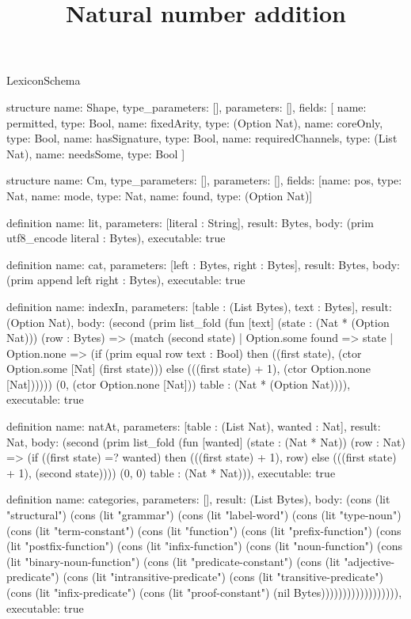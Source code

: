 \begin{lexlean}{LexiconSchema}
\title{Natural number addition}
\begin{semanticmodule}
structure{
  name: Shape,
  type_parameters: [],
  parameters: [],
  fields: [
    {name: permitted, type: Bool},
    {name: fixedArity, type: (Option Nat)},
    {name: coreOnly, type: Bool},
    {name: hasSignature, type: Bool},
    {name: requiredChannels, type: (List Nat)},
    {name: needsSome, type: Bool}
  ]
}

structure{
  name: Cm,
  type_parameters: [],
  parameters: [],
  fields: [{name: pos, type: Nat}, {name: mode, type: Nat}, {name: found, type: (Option Nat)}]
}

definition{
  name: lit,
  parameters: [literal : String],
  result: Bytes,
  body: (prim utf8_encode literal : Bytes),
  executable: true
}

definition{
  name: cat,
  parameters: [left : Bytes, right : Bytes],
  result: Bytes,
  body: (prim append left right : Bytes),
  executable: true
}

definition{
  name: indexIn,
  parameters: [table : (List Bytes), text : Bytes],
  result: (Option Nat),
  body: (second (prim list_fold (fun [text] (state : (Nat * (Option Nat))) (row : Bytes) => (match (second state)
    | Option.some found => state
    | Option.none => (if (prim equal row text : Bool) then ((first state), (ctor Option.some [Nat] (first state))) else (((first state) + 1), (ctor Option.none [Nat]))))) (0, (ctor Option.none [Nat])) table : (Nat * (Option Nat)))),
  executable: true
}

definition{
  name: natAt,
  parameters: [table : (List Nat), wanted : Nat],
  result: Nat,
  body: (second (prim list_fold (fun [wanted] (state : (Nat * Nat)) (row : Nat) => (if ((first state) =? wanted) then (((first state) + 1), row) else (((first state) + 1), (second state)))) (0, 0) table : (Nat * Nat))),
  executable: true
}

definition{
  name: categories,
  parameters: [],
  result: (List Bytes),
  body: (cons (lit "structural") (cons (lit "grammar") (cons (lit "label-word") (cons (lit "type-noun") (cons (lit "term-constant") (cons (lit "function") (cons (lit "prefix-function") (cons (lit "postfix-function") (cons (lit "infix-function") (cons (lit "noun-function") (cons (lit "binary-noun-function") (cons (lit "predicate-constant") (cons (lit "adjective-predicate") (cons (lit "intransitive-predicate") (cons (lit "transitive-predicate") (cons (lit "infix-predicate") (cons (lit "proof-constant") (nil Bytes)))))))))))))))))),
  executable: true
}


\end{semanticmodule}
\end{lexlean}
